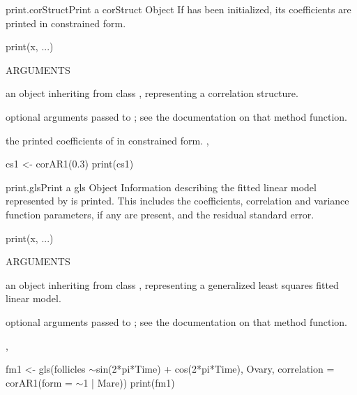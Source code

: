 \documentclass[pdftex]{article} \usepackage{url,graphicx}
\renewcommand{\Twiddle}{\mbox{\(\sim\)}}
\begin{document}
\begin{Helpfile}{print.corStruct}{Print a corStruct Object}
If  has been initialized, its coefficients are printed in
constrained form.
\begin{Example}
print(x, ...)
\end{Example}
\begin{Argument}{ARGUMENTS}
\item[\Co{x:}]
an object inheriting from class , representing
a correlation structure.
\item[\Co{...:}]
optional arguments passed to ; see
the documentation on that method function.
\end{Argument}
the printed coefficients of  in constrained form.
, 
\need 15pt
\vspace{-16pt} 
\begin{Example}
cs1 <- corAR1(0.3)
print(cs1)
\end{Example}
\end{Helpfile}
\begin{Helpfile}{print.gls}{Print a gls Object}
Information describing the fitted linear model represented by 
is printed. This includes the coefficients, correlation and variance
function parameters, if any are present, and the residual standard
error.
\begin{Example}
print(x, ...)
\end{Example}
\begin{Argument}{ARGUMENTS}
\item[\Co{x:}]
an object inheriting from class , representing
a generalized least squares fitted linear model.
\item[\Co{...:}]
optional arguments passed to ; see
the documentation on that method function.
\end{Argument}
, 
\need 15pt
\vspace{-16pt} 
\begin{Example}
fm1 <- gls(follicles \Twiddle sin(2*pi*Time) + cos(2*pi*Time), Ovary,
           correlation = corAR1(form = \Twiddle 1 | Mare))
print(fm1)
\end{Example}
\end{Helpfile}
\end{document}
